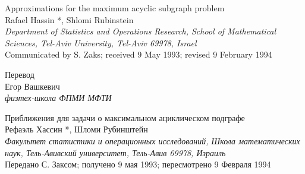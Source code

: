 \documentclass[a4paper, 12pt, oneside]{extarticle}  %
\begin{document}
% 


\SetTitlePageSettings

\begin{adjustwidth}{-5mm}{-5mm} %
  \begin{center}
    \LARGE{Approximations for the maximum acyclic subgraph problem} \\
    \vspace{8pt}
    \large{Rafael Hassin *, Shlomi Rubinstein} \\
    \vspace{3pt}
    \small\textit{Department of Statistics and Operations Research, School of Mathematical Sciences, Tel-Aviv University, Tel-Aviv 69978, Israel} \\
    \vspace{3pt}
    \small{Communicated by S. Zaks; received 9 May 1993; revised 9 February 1994}
  \end{center}
\end{adjustwidth}

\vspace{15pt}

\begin{adjustwidth}{-5mm}{-5mm} %
  \begin{center}
    \LARGE{Перевод} \\
    \vspace{8pt}
    \large{Егор Вашкевич} \\
    \vspace{3pt}
    \small\textit{физтех-школа ФПМИ МФТИ}
  \end{center}
\end{adjustwidth}

\vspace{15pt}

\begin{adjustwidth}{-5mm}{-5mm} %
  \begin{center}
    \LARGE{Приближения для задачи о максимальном ациклическом подграфе} \\
    \vspace{8pt}
    \large{Рефаэль Хассин *, Шломи Рубинштейн} \\
    \vspace{3pt}
    \small\textit{Факультет статистики и операционных исследований, Школа математических наук, Тель-Авивский университет, Тель-Авив 69978, Израиль} \\
    \vspace{3pt}
    \small{Передано С. Заксом; получено 9 мая 1993; пересмотрено 9 Февраля 1994}
  \end{center}
\end{adjustwidth}
\end{document}
